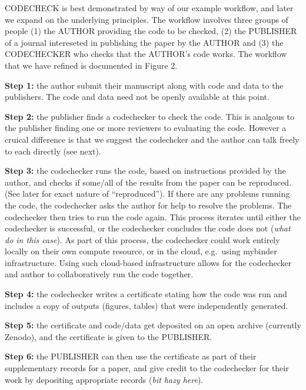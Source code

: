 \documentclass[12pt]{article}
\begin{document}
CODECHECK is best demonstrated by way of our example workflow, and later
we expand on the underlying principles. The workflow involves three
groups of people (1) the AUTHOR providing the code to be checked, (2)
the PUBLISHER of a journal intereseted in publishing the paper by the
AUTHOR and (3) the CODECHECKER who checks that the AUTHOR's code works.
The workflow that we have refined is documented in Figure 2.

\textbf{Step 1:} the author submit their manuscript along with code and data to
the publishers. The code and data need not be openly available at this
point.

\textbf{Step 2:} the publisher finds a codechecker to check the code. This is
analgous to the publisher finding one or more reviewers to evaluating
the code. However a cruical difference is that we suggest the codechcker
and the author can talk freely to each directly (see next).

\textbf{Step 3:} the codechecker runs the code, based on instructions provided by
the author, and checks if some/all of the results from the paper can be
reproduced. (See later for exact nature of ``reproduced''). If there are
any problems running the code, the codechecker asks the author for help
to resolve the problems. The codechecker then tries to run the code
again. This process iterates until either the codechecker is successful,
or the codechecker concludes the code does not (\emph{what do in this
case}). As part of this process, the codechecker could work entirely
locally on their own compute resource, or in the cloud, e.g.~using
mybinder infrastructure. Using such cloud-based infrastructure allows
for the codechecker and author to collaboratively run the code together.

\textbf{Step 4:} the codechecker writes a certificate stating how the code was
run and includes a copy of outputs (figures, tables) that were
independently generated.

\textbf{Step 5:} the certificate and code/data get deposited on an open archive
(currently Zenodo), and the certificate is given to the PUBLISHER.

\textbf{Step 6:} the PUBLISHER can then use the certificate as part of their
supplementary records for a paper, and give credit to the codechecker
for their work by depositing appropriate records (\emph{bit hazy here}).
\end{document}
